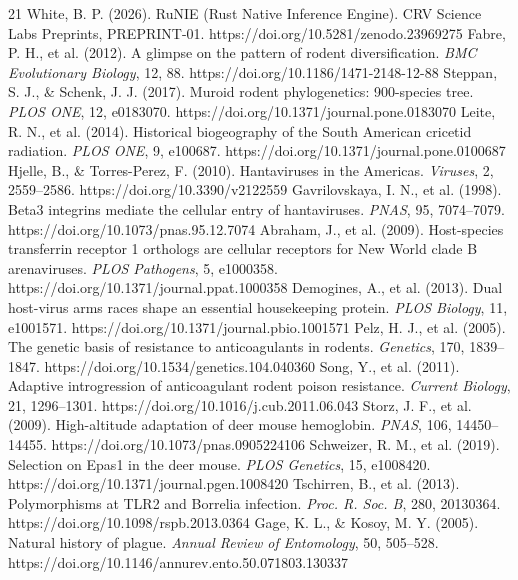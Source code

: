\documentclass[10pt,letterpaper]{article}
\begin{document}
\begin{thebibliography}{21}
 White, B. P. (2026). RuNIE (Rust Native Inference Engine). CRV Science Labs Preprints, PREPRINT-01. https://doi.org/10.5281/zenodo.23969275
 Fabre, P. H., et al. (2012). A glimpse on the pattern of rodent diversification. \emph{BMC Evolutionary Biology}, 12, 88. https://doi.org/10.1186/1471-2148-12-88
 Steppan, S. J., \& Schenk, J. J. (2017). Muroid rodent phylogenetics: 900-species tree. \emph{PLOS ONE}, 12, e0183070. https://doi.org/10.1371/journal.pone.0183070
 Leite, R. N., et al. (2014). Historical biogeography of the South American cricetid radiation. \emph{PLOS ONE}, 9, e100687. https://doi.org/10.1371/journal.pone.0100687
 Hjelle, B., \& Torres-Perez, F. (2010). Hantaviruses in the Americas. \emph{Viruses}, 2, 2559--2586. https://doi.org/10.3390/v2122559
 Gavrilovskaya, I. N., et al. (1998). Beta3 integrins mediate the cellular entry of hantaviruses. \emph{PNAS}, 95, 7074--7079. https://doi.org/10.1073/pnas.95.12.7074
 Abraham, J., et al. (2009). Host-species transferrin receptor 1 orthologs are cellular receptors for New World clade B arenaviruses. \emph{PLOS Pathogens}, 5, e1000358. https://doi.org/10.1371/journal.ppat.1000358
 Demogines, A., et al. (2013). Dual host-virus arms races shape an essential housekeeping protein. \emph{PLOS Biology}, 11, e1001571. https://doi.org/10.1371/journal.pbio.1001571
 Pelz, H. J., et al. (2005). The genetic basis of resistance to anticoagulants in rodents. \emph{Genetics}, 170, 1839--1847. https://doi.org/10.1534/genetics.104.040360
 Song, Y., et al. (2011). Adaptive introgression of anticoagulant rodent poison resistance. \emph{Current Biology}, 21, 1296--1301. https://doi.org/10.1016/j.cub.2011.06.043
 Storz, J. F., et al. (2009). High-altitude adaptation of deer mouse hemoglobin. \emph{PNAS}, 106, 14450--14455. https://doi.org/10.1073/pnas.0905224106
 Schweizer, R. M., et al. (2019). Selection on Epas1 in the deer mouse. \emph{PLOS Genetics}, 15, e1008420. https://doi.org/10.1371/journal.pgen.1008420
 Tschirren, B., et al. (2013). Polymorphisms at TLR2 and Borrelia infection. \emph{Proc. R. Soc. B}, 280, 20130364. https://doi.org/10.1098/rspb.2013.0364
 Gage, K. L., \& Kosoy, M. Y. (2005). Natural history of plague. \emph{Annual Review of Entomology}, 50, 505--528. https://doi.org/10.1146/annurev.ento.50.071803.130337

\end{thebibliography}
\end{document}

